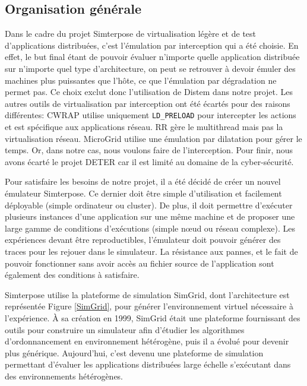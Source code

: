 \subsection{Organisation générale}

Dans le cadre du projet Simterpose de virtualisation légère et de test
d'applications distribuées, c'est l'émulation par interception qui a été
choisie. En effet, le but final étant de pouvoir évaluer n'importe quelle
application distribuée sur n'importe quel type d'architecture, on peut se
retrouver à devoir émuler des machines plus puissantes que l'hôte, ce que
l'émulation par dégradation ne permet pas. Ce choix exclut donc l'utilisation de
Distem dans notre projet. Les autres outils de virtualisation par interception
ont été écartés pour des raisons différentes: CWRAP utilise uniquement
\texttt{LD\_PRELOAD} pour intercepter les actions et est spécifique aux
applications réseau. RR gère le multithread mais pas la virtualisation réseau. MicroGrid utilise une émulation par dilatation pour gérer le temps. Or, dans notre cas, nous voulons faire de l'interception. Pour finir, nous avons écarté le projet DETER car il est limité au domaine de la cyber-sécurité.

Pour satisfaire les besoins de notre projet, il a été décidé de créer un nouvel
émulateur Simterpose. Ce dernier doit être simple d'utilisation et facilement
déployable (simple ordinateur ou cluster).  De plus, il doit permettre
d'exécuter plusieurs instances d'une application sur une même machine et de proposer une large gamme de conditions d'exécutions (simple n\oe ud ou réseau
complexe). Les expériences devant être reproductibles, l'émulateur doit pouvoir
générer des traces pour les rejouer dans le simulateur. La résistance aux
pannes, et le fait de pouvoir fonctionner sans avoir accès au fichier source de
l'application sont également des conditions à satisfaire.

Simterpose utilise la plateforme de simulation SimGrid, dont l'architecture est
représentée Figure \ref{SimGrid}, pour générer l'environnement virtuel
nécessaire à l'expérience. À sa création en 1999, SimGrid était une plateforme
fournissant des outils pour construire un simulateur afin d'étudier les
algorithmes d'ordonnancement en environnement hétérogène, puis il a évolué \citep{casanova:hal-01017319} pour devenir plus générique. Aujourd'hui, c'est
devenu une plateforme de simulation permettant d'évaluer les applications
distribuées large échelle s'exécutant dans des environnements hétérogènes.
 
